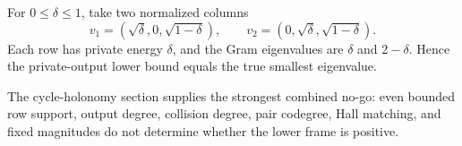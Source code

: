 \begin{example}
For \(0\le\delta\le1\), take two normalized columns
\[
 v_1=(\sqrt\delta,0,\sqrt{1-\delta}),\qquad
 v_2=(0,\sqrt\delta,\sqrt{1-\delta}).
\]
Each row has private energy \(\delta\), and the Gram eigenvalues are
\(\delta\) and \(2-\delta\). Hence the private-output lower bound equals the
true smallest eigenvalue.
\end{example}

The cycle-holonomy section supplies the strongest combined no-go: even bounded
row support, output degree, collision degree, pair codegree, Hall matching, and
fixed magnitudes do not determine whether the lower frame is positive.
